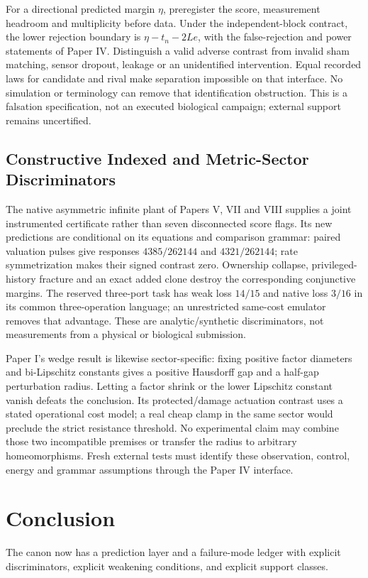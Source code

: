 \documentclass[11pt,a4paper]{article}
\begin{document}
For a directional predicted margin $\eta$, preregister the score, measurement headroom and multiplicity before data. Under the independent-block contract, the lower rejection boundary is $\eta-t_n-2Le$, with the false-rejection and power statements of Paper IV. Distinguish a valid adverse contrast from invalid sham matching, sensor dropout, leakage or an unidentified intervention. Equal recorded laws for candidate and rival make separation impossible on that interface. No simulation or terminology can remove that identification obstruction. This is a falsation specification, not an executed biological campaign; external support remains uncertified.

\subsection{Constructive Indexed and Metric-Sector Discriminators}
The native asymmetric infinite plant of Papers V, VII and VIII supplies a
joint instrumented certificate rather than seven disconnected score flags.
Its new predictions are conditional on its equations and comparison grammar:
paired valuation pulses give responses $4385/262144$ and $4321/262144$;
rate symmetrization makes their signed contrast zero. Ownership collapse,
privileged-history fracture and an exact added clone destroy the corresponding
conjunctive margins. The reserved three-port task has weak loss $14/15$ and
native loss $3/16$ in its common three-operation language; an unrestricted
same-cost emulator removes that advantage. These are analytic/synthetic
discriminators, not measurements from a physical or biological submission.

Paper I's wedge result is likewise sector-specific: fixing positive factor
diameters and bi-Lipschitz constants gives a positive Hausdorff gap and a
half-gap perturbation radius. Letting a factor shrink or the lower Lipschitz
constant vanish defeats the conclusion. Its protected/damage actuation
contrast uses a stated operational cost model; a real cheap clamp in the
same sector would preclude the strict resistance threshold. No experimental
claim may combine those two incompatible premises or transfer the radius to
arbitrary homeomorphisms. Fresh external tests must identify these observation,
control, energy and grammar assumptions through the Paper IV interface.

\section{Conclusion}
The canon now has a prediction layer and a failure-mode ledger with explicit discriminators, explicit weakening conditions, and explicit support classes.
\end{document}
